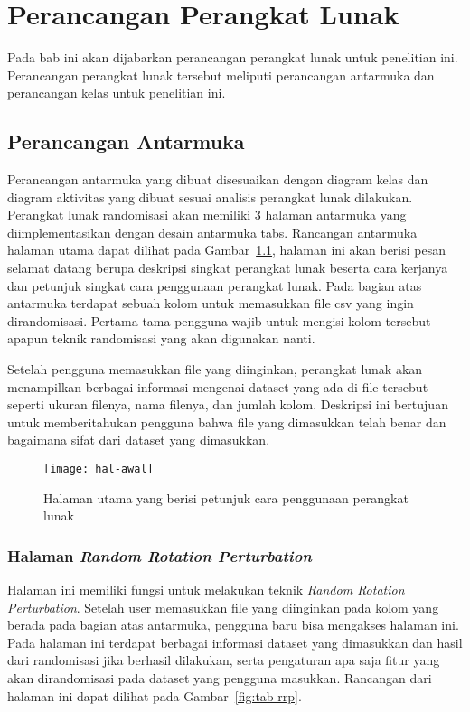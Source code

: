 \chapter{Perancangan Perangkat Lunak}
\label{chap:perancangan}

Pada bab ini akan dijabarkan perancangan perangkat lunak untuk penelitian ini. Perancangan perangkat lunak tersebut meliputi perancangan antarmuka dan perancangan kelas untuk penelitian ini.

\section{Perancangan Antarmuka}
\label{sec:antarmuka}

Perancangan antarmuka yang dibuat disesuaikan dengan diagram kelas dan diagram aktivitas yang dibuat sesuai analisis perangkat lunak dilakukan. Perangkat lunak randomisasi akan memiliki 3 halaman antarmuka yang diimplementasikan dengan desain antarmuka tabs. Rancangan antarmuka halaman utama dapat dilihat pada Gambar~\ref{fig:hal-awal}, halaman ini akan berisi pesan selamat datang berupa deskripsi singkat perangkat lunak beserta cara kerjanya dan petunjuk singkat cara penggunaan perangkat lunak. Pada bagian atas antarmuka terdapat sebuah kolom untuk memasukkan file csv yang ingin dirandomisasi. Pertama-tama pengguna wajib untuk mengisi kolom tersebut apapun teknik randomisasi yang akan digunakan nanti.

Setelah pengguna memasukkan file yang diinginkan, perangkat lunak akan menampilkan berbagai informasi mengenai dataset yang ada di file tersebut seperti ukuran filenya, nama filenya, dan jumlah kolom. Deskripsi ini bertujuan untuk memberitahukan pengguna bahwa file yang dimasukkan telah benar dan bagaimana sifat dari dataset yang dimasukkan. 

\begin{figure}
	\centering
	\texttt{[image: hal-awal]}
	\caption{Halaman utama yang berisi petunjuk cara penggunaan perangkat lunak}
	\label{fig:hal-awal}
\end{figure}

\subsection{Halaman \textit{Random Rotation Perturbation}}
\label{subsec:tabrrp}

Halaman ini memiliki fungsi untuk melakukan teknik \textit{Random Rotation Perturbation}. Setelah user memasukkan file yang diinginkan pada kolom yang berada pada bagian atas antarmuka, pengguna baru bisa mengakses halaman ini. Pada halaman ini terdapat berbagai informasi dataset yang dimasukkan dan hasil dari randomisasi jika berhasil dilakukan, serta pengaturan apa saja fitur yang akan dirandomisasi pada dataset yang pengguna masukkan. Rancangan dari halaman ini dapat dilihat pada Gambar~\ref{fig:tab-rrp}.


